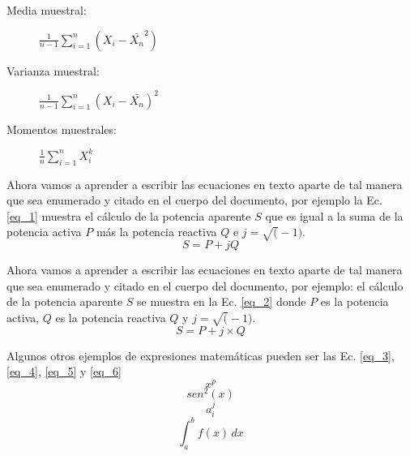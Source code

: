 \documentclass{article}
\begin{document}
\begin{description}
    \item[Media muestral:] $\frac{1}{n-1} \sum_{i=1}^n (X_i - \bar{X_n}^2)$
    \item[Varianza muestral:] $\frac{1}{n-1} \sum_{i=1}^n (X_i - \bar{X_n})^2$ 
    \item[Momentos muestrales:] $\frac{1}{n} \sum_{i=1}^n X_i^k$
\end{description}

Ahora vamos a aprender a escribir las ecuaciones en texto aparte de tal manera que sea enumerado y citado en el cuerpo del documento, por ejemplo la Ec. \eqref{eq_1} muestra el cálculo de la potencia aparente $S$ que es igual a la suma de la potencia activa $P$ más la potencia reactiva $Q$ e $j = \sqrt(-1)$.
\begin{equation} \label{eq_1}
    S = P + jQ
\end{equation}

Ahora vamos a aprender a escribir las ecuaciones en texto aparte de tal manera que sea enumerado y citado en el cuerpo del documento, por ejemplo: el cálculo de la potencia aparente $S$ se muestra en la Ec. \eqref{eq_2} donde $P$ es la potencia activa, $Q$ es la potencia reactiva $Q$ y $j = \sqrt(-1)$.
\begin{equation} \label{eq_2}
    S = P + j \times Q
\end{equation}

Algunos otros ejemplos de expresiones matemáticas pueden ser las Ec. \eqref{eq_3}, \eqref{eq_4}, \eqref{eq_5} y \eqref{eq_6}
\begin{equation} \label{eq_3}
    x^p
\end{equation}
\begin{equation} \label{eq_4}
    sen^2(x)
\end{equation}
\begin{equation} \label{eq_5}
    a_i^j
\end{equation}
\begin{equation} \label{eq_6}
    \int_a^b f(x)\, dx
\end{equation}
\end{document}
